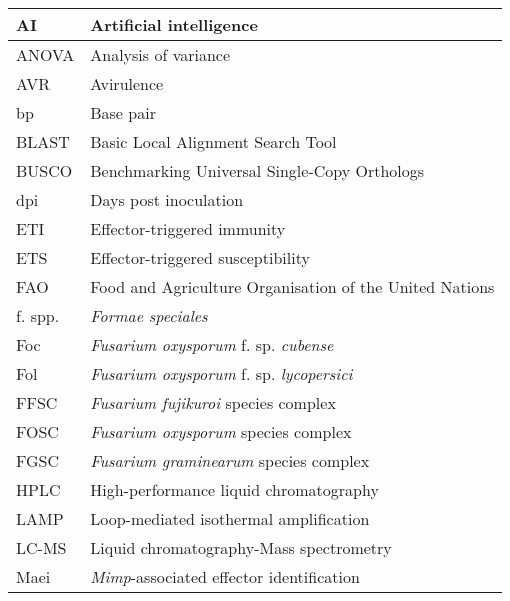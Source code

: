 \begin{longtable}{ll}
\caption{}
\label{tab:my-table}\\
AI       & Artificial   intelligence                                 \\
\endfirsthead
%
\endhead
%
ANOVA    & Analysis of   variance                                    \\
AVR      & Avirulence                                                \\
bp       & Base pair                                                 \\
BLAST    & Basic Local   Alignment Search Tool                       \\
BUSCO    & Benchmarking   Universal Single-Copy Orthologs            \\
dpi      & Days post inoculation                                     \\
ETI      & Effector-triggered   immunity                             \\
ETS      & Effector-triggered   susceptibility                       \\
FAO      & Food and   Agriculture Organisation of the United Nations \\
f. spp.  & \textit{Formae   speciales}                                        \\
Foc      & \textit{Fusarium oxysporum} f. sp. \textit{cubense}                         \\
Fol      & \textit{Fusarium oxysporum} f. sp.   \textit{lycopersici}                   \\
FFSC     & \textit{Fusarium fujikuroi} species complex                        \\
FOSC     & \textit{Fusarium oxysporum }species complex                        \\
FGSC     & \textit{Fusarium   graminearum }species complex                    \\
HPLC     & High-performance   liquid chromatography                  \\
LAMP     & Loop-mediated   isothermal amplification                  \\
LC-MS    & Liquid   chromatography-Mass spectrometry                 \\
Maei     & \textit{Mimp}-associated   effector identification                 \\

\end{longtable}
